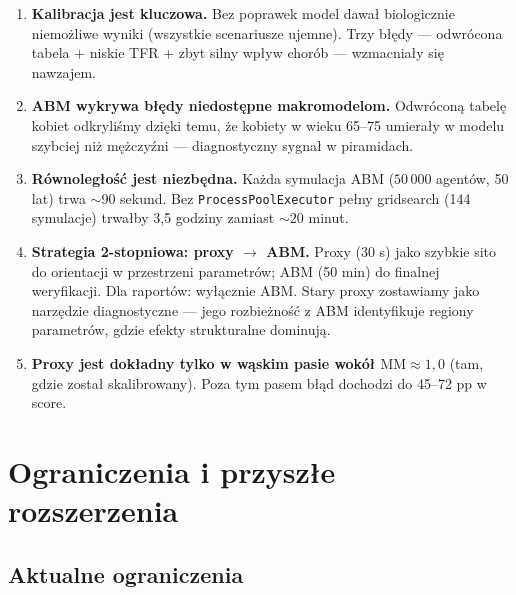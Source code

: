 \documentclass[11pt,a4paper]{article}
\begin{document}
\begin{enumerate}[leftmargin=*, itemsep=4pt, resume]
  \item \textbf{Kalibracja jest kluczowa.} Bez poprawek model dawał biologicznie niemożliwe wyniki (wszystkie scenariusze ujemne). Trzy błędy --- odwrócona tabela + niskie TFR + zbyt silny wpływ chorób --- wzmacniały się nawzajem.

  \item \textbf{ABM wykrywa błędy niedostępne makromodelom.} Odwróconą tabelę kobiet odkryliśmy dzięki temu, że kobiety w wieku 65--75 umierały w modelu szybciej niż mężczyźni --- diagnostyczny sygnał w piramidach.

  \item \textbf{Równoległość jest niezbędna.} Każda symulacja ABM ($50\,000$ agentów, 50 lat) trwa $\sim$90 sekund. Bez \texttt{ProcessPoolExecutor} pełny gridsearch (144 symulacje) trwałby 3{,}5 godziny zamiast $\sim 20$ minut.

  \item \textbf{Strategia 2-stopniowa: proxy $\to$ ABM.} Proxy (30 s) jako szybkie sito do orientacji w przestrzeni parametrów; ABM (50 min) do finalnej weryfikacji. Dla raportów: wyłącznie ABM. Stary proxy zostawiamy jako narzędzie diagnostyczne --- jego rozbieżność z ABM identyfikuje regiony parametrów, gdzie efekty strukturalne dominują.

  \item \textbf{Proxy jest dokładny tylko w wąskim pasie wokół $\mathrm{MM} \approx 1{,}0$} (tam, gdzie został skalibrowany). Poza tym pasem błąd dochodzi do 45--72 pp w score.
\end{enumerate}

\newpage
\section{Ograniczenia i przyszłe rozszerzenia}

\subsection{Aktualne ograniczenia}
\end{document}
